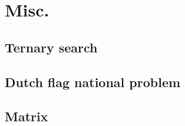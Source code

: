 \section{Misc.}

\subsection{Ternary search}

\subsection{Dutch flag national problem}

\subsection{Matrix}

